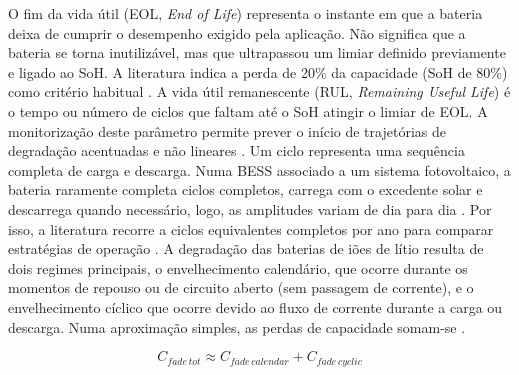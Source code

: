 O fim da vida útil (EOL, \textit{End of Life}) representa o instante em que a bateria deixa de cumprir o desempenho exigido pela aplicação. Não significa que a bateria se torna inutilizável, mas que ultrapassou um limiar definido previamente e ligado ao SoH. A literatura indica a perda de 20\% da capacidade (SoH de 80\%) como critério habitual \cite{ Wu2022}.
A vida útil remanescente (RUL, \textit{Remaining Useful Life}) é o tempo ou número de ciclos que faltam até o SoH atingir o limiar de EOL. A monitorização deste parâmetro permite prever o início de trajetórias de degradação acentuadas e não lineares \cite{Nazaralizadeh2024}. 
Um ciclo representa uma sequência completa de carga e descarga. Numa BESS associado a um sistema fotovoltaico, a bateria raramente completa ciclos completos, carrega com o excedente solar e descarrega quando necessário, logo, as amplitudes variam de dia para dia \cite{ Mishra2020}. Por isso, a literatura recorre a ciclos equivalentes completos por ano para comparar estratégias de operação \cite{ Azuatalam2019}. 
A degradação das baterias de iões de lítio resulta de dois regimes principais, o envelhecimento calendário, que ocorre durante os momentos de repouso ou de circuito aberto (sem passagem de corrente), e o envelhecimento cíclico que ocorre devido ao fluxo de corrente durante a carga ou descarga. Numa aproximação simples, as perdas de capacidade somam-se \cite{ Raj2020}\cite{ Hesse2017}. 



\[
C_{fade\,tot} \approx C_{fade\,calendar} + C_{fade\,cyclic}
\]

